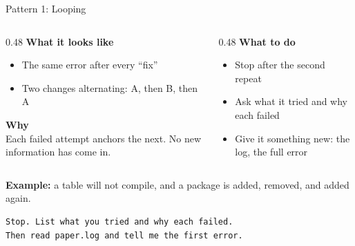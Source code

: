 \documentclass[aspectratio=169, 11pt]{beamer}
\begin{document}
\begin{frame}[fragile]{Pattern 1: Looping}
  \begin{columns}[T]
    \begin{column}{0.48\textwidth}
      \textbf{What it looks like}
      \begin{itemize}
        \small
        \item The same error after every ``fix''
        \item Two changes alternating: A, then B, then A
      \end{itemize}
      \vspace{0.4em}
      \textbf{Why}\\[0.2em]
      {\small Each failed attempt anchors the next. No new information has come in.}
    \end{column}
    \begin{column}{0.48\textwidth}
      \textbf{What to do}
      \begin{itemize}
        \small
        \item Stop after the second repeat
        \item Ask what it tried and why each failed
        \item Give it something new: the log, the full error
      \end{itemize}
    \end{column}
  \end{columns}

  \vspace{0.6em}
  \textbf{Example:} a table will not compile, and a package is added, removed, and added again.

  \vspace{0.3em}
  \begin{lstlisting}[basicstyle=\ttfamily\footnotesize]
Stop. List what you tried and why each failed.
Then read paper.log and tell me the first error.
  \end{lstlisting}
\end{frame}
\end{document}
